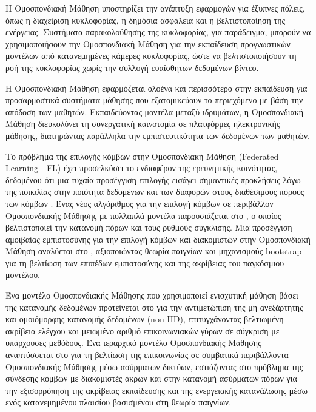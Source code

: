 Η Ομοσπονδιακή Μάθηση υποστηρίζει την ανάπτυξη εφαρμογών για έξυπνες πόλεις, όπως η διαχείριση κυκλοφορίας, η δημόσια ασφάλεια και η βελτιστοποίηση της ενέργειας. Συστήματα παρακολούθησης της κυκλοφορίας, για παράδειγμα, μπορούν να χρησιμοποιήσουν την Ομοσπονδιακή Μάθηση για την εκπαίδευση προγνωστικών μοντέλων από κατανεμημένες κάμερες κυκλοφορίας, ώστε να βελτιστοποιήσουν τη ροή της κυκλοφορίας χωρίς την συλλογή ευαίσθητων δεδομένων βίντεο.

Η Ομοσπονδιακή Μάθηση εφαρμόζεται ολοένα και περισσότερο στην εκπαίδευση για προσαρμοστικά συστήματα μάθησης που εξατομικεύουν το περιεχόμενο με βάση την απόδοση των μαθητών. Εκπαιδεύοντας μοντέλα μεταξύ ιδρυμάτων, η Ομοσπονδιακή Μάθηση διευκολύνει τη συνεργατική καινοτομία σε πλατφόρμες ηλεκτρονικής μάθησης, διατηρώντας παράλληλα την εμπιστευτικότητα των δεδομένων των μαθητών.

Το πρόβλημα της επιλογής κόμβων στην Ομοσπονδιακή Μάθηση (Federated Learning - FL) έχει προσελκύσει το ενδιαφέρον της ερευνητικής κοινότητας, δεδομένου ότι μια τυχαία προσέγγιση επιλογής εισάγει σημαντικές προκλήσεις λόγω της ποικιλίας στην ποιότητα δεδομένων και των διαφορών στους διαθέσιμους πόρους των κόμβων . Ένας νέος αλγόριθμος για την επιλογή κόμβων σε περιβάλλον Ομοσπονδιακής Μάθησης με πολλαπλά μοντέλα παρουσιάζεται στο , ο οποίος βελτιστοποιεί την κατανομή πόρων και τους ρυθμούς σύγκλισης. Μια προσέγγιση αμοιβαίας εμπιστοσύνης για την επιλογή κόμβων και διακομιστών στην Ομοσπονδιακή Μάθηση αναλύεται στο , αξιοποιώντας θεωρία παιγνίων και μηχανισμούς bootstrap για τη βελτίωση των επιπέδων εμπιστοσύνης και της ακρίβειας του παγκόσμιου μοντέλου.

Ένα μοντέλο Ομοσπονδιακής Μάθησης που χρησιμοποιεί ενισχυτική μάθηση βάσει της κατανομής δεδομένων προτείνεται στο  για την αντιμετώπιση της μη ανεξάρτητης και ομοιόμορφης κατανομής δεδομένων (non-IID), επιτυγχάνοντας βελτιωμένη ακρίβεια ελέγχου και μειωμένο αριθμό επικοινωνιακών γύρων σε σύγκριση με υπάρχουσες μεθόδους. Ένα ιεραρχικό μοντέλο Ομοσπονδιακής Μάθησης αναπτύσσεται στο  για τη βελτίωση της επικοινωνίας σε συμβατικά περιβάλλοντα Ομοσπονδιακής Μάθησης μέσω ασύρματων δικτύων, εστιάζοντας στο πρόβλημα της σύνδεσης κόμβων με διακομιστές άκρων και στην κατανομή ασύρματων πόρων για την εξισορρόπηση της ακρίβειας εκπαίδευσης και της ενεργειακής κατανάλωσης μέσω ενός κατανεμημένου πλαισίου βασισμένου στη θεωρία παιγνίων.

